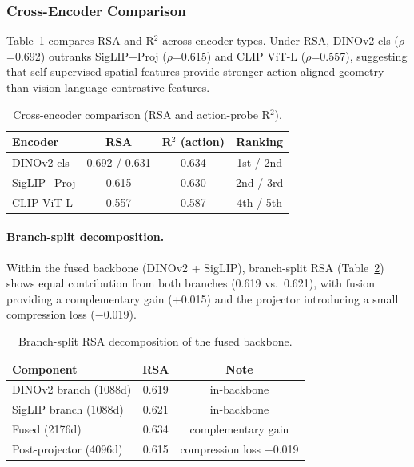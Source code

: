 \documentclass[letterpaper]{article}
\begin{document}
\subsubsection{Cross-Encoder Comparison}
\label{sec:cross-encoder}

Table~\ref{tab:cross-encoder} compares RSA and R$^2$ across encoder types.
Under RSA, DINOv2 cls ($\rho$=0.692) outranks SigLIP+Proj ($\rho$=0.615) and CLIP ViT-L ($\rho$=0.557), suggesting that self-supervised spatial features provide stronger action-aligned geometry than vision-language contrastive features.

\begin{table}[t]
\centering
\caption{Cross-encoder comparison (RSA and action-probe R$^2$).}
\label{tab:cross-encoder}
\small
\begin{tabular}{lccc}
\toprule
Encoder & RSA & R$^2$ (action) & Ranking \\
\midrule
DINOv2 cls       & 0.692 / 0.631 & 0.634 & 1st / 2nd \\
SigLIP+Proj      & 0.615         & 0.630 & 2nd / 3rd \\
CLIP ViT-L       & 0.557         & 0.587 & 4th / 5th \\
\bottomrule
\end{tabular}
\end{table}

\paragraph{Branch-split decomposition.}
Within the fused backbone (DINOv2 + SigLIP), branch-split RSA (Table~\ref{tab:branch-split}) shows equal contribution from both branches (0.619 vs.\ 0.621), with fusion providing a complementary gain (+0.015) and the projector introducing a small compression loss ($-$0.019).

\begin{table}[t]
\centering
\caption{Branch-split RSA decomposition of the fused backbone.}
\label{tab:branch-split}
\small
\begin{tabular}{lcc}
\toprule
Component & RSA & Note \\
\midrule
DINOv2 branch (1088d)  & 0.619 & in-backbone \\
SigLIP branch (1088d)  & 0.621 & in-backbone \\
Fused (2176d)          & 0.634 & complementary gain \\
Post-projector (4096d) & 0.615 & compression loss $-$0.019 \\
\bottomrule
\end{tabular}
\end{table}
\end{document}
